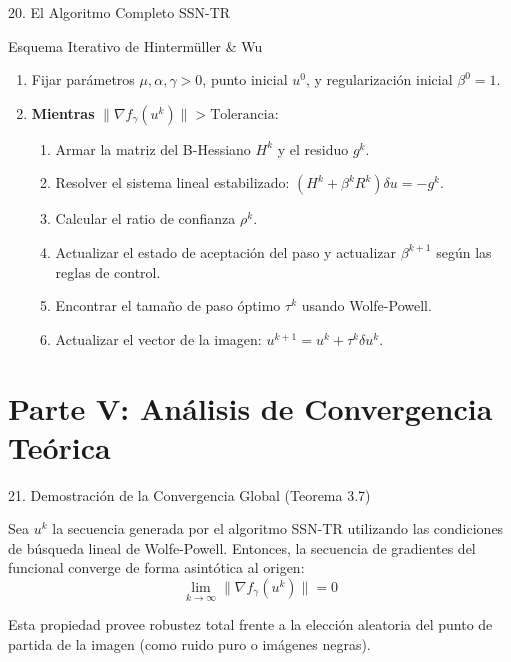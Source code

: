 \documentclass[aspectratio=169,11pt]{beamer}
\begin{document}
\begin{frame}{20. El Algoritmo Completo SSN-TR}
    \begin{block}{Esquema Iterativo de Hintermüller \& Wu}
        \begin{enumerate}
            \item Fijar parámetros $\mu, \alpha, \gamma > 0$, punto inicial $u^0$, y regularización inicial $\beta^0 = 1$.
            \item \textbf{Mientras} $\|\nabla f_\gamma(u^k)\| > \text{Tolerancia}$:
            \begin{enumerate}
                \item Armar la matriz del B-Hessiano $H^k$ y el residuo $g^k$.
                \item Resolver el sistema lineal estabilizado: $(H^k + \beta^k R^k)\delta u = -g^k$.
                \item Calcular el ratio de confianza $\rho^k$.
                \item Actualizar el estado de aceptación del paso y actualizar $\beta^{k+1}$ según las reglas de control.
                \item Encontrar el tamaño de paso óptimo $\tau^k$ usando Wolfe-Powell.
                \item Actualizar el vector de la imagen: $u^{k+1} = u^k + \tau^k \delta u^k$.
            \end{enumerate}
        \end{enumerate}
    \end{block}
\end{frame}

\section{Parte V: Análisis de Convergencia Teórica}

\begin{frame}{21. Demostración de la Convergencia Global (Teorema 3.7)}
    \begin{theorem}
        Sea $u^k$ la secuencia generada por el algoritmo SSN-TR utilizando las condiciones de búsqueda lineal de Wolfe-Powell. Entonces, la secuencia de gradientes del funcional converge de forma asintótica al origen:
        \begin{equation}
            \lim_{k \to \infty} \| \nabla f_\gamma(u^k) \| = 0
        \end{equation}
    \end{theorem}
    Esta propiedad provee robustez total frente a la elección aleatoria del punto de partida de la imagen (como ruido puro o imágenes negras).
\end{frame}
\end{document}
